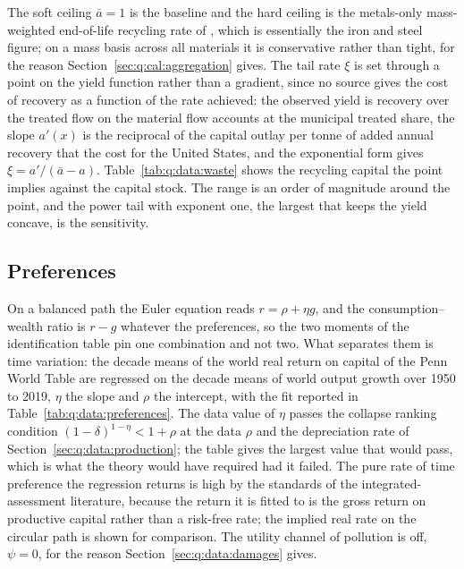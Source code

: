  The soft ceiling $\bar a=1$ is the baseline and the hard ceiling is the metals-only mass-weighted end-of-life recycling rate of \textcite{unepirp2011}, which is essentially the iron and steel figure; on a mass basis across all materials it is conservative rather than tight, for the reason Section~\ref{sec:q:cal:aggregation} gives. The tail rate $\xi$ is set through a point on the yield function rather than a gradient, since no source gives the cost of recovery as a function of the rate achieved: the observed yield is recovery over the treated flow on the material flow accounts at the municipal treated share, the slope $a'\left(x\right)$ is the reciprocal of the capital outlay per tonne of added annual recovery that the \textcite{epa2024} cost for the United States, and the exponential form gives $\xi=a'/\left(\bar a-a\right)$. Table~\ref{tab:q:data:waste} shows the recycling capital the point implies against the capital stock. The range is an order of magnitude around the point, and the power tail with exponent one, the largest that keeps the yield concave, is the sensitivity.



\subsection{Preferences}\label{sec:q:data:preferences}

On a balanced path the Euler equation reads $r=\rho+\eta g$, and the consumption--wealth ratio is $r-g$ whatever the preferences, so the two moments of the identification table pin one combination and not two. What separates them is time variation: the decade means of the world real return on capital of the Penn World Table are regressed on the decade means of world output growth over 1950 to 2019, $\eta$ the slope and $\rho$ the intercept, with the fit reported in Table~\ref{tab:q:data:preferences}. The data value of $\eta$ passes the collapse ranking condition $\left(1-\delta\right)^{1-\eta}<1+\rho$ at the data $\rho$ and the depreciation rate of Section~\ref{sec:q:data:production}; the table gives the largest value that would pass, which is what the theory would have required had it failed. The pure rate of time preference the regression returns is high by the standards of the integrated-assessment literature, because the return it is fitted to is the gross return on productive capital rather than a risk-free rate; the implied real rate on the circular path is shown for comparison. The utility channel of pollution is off, $\psi=0$, for the reason Section~\ref{sec:q:data:damages} gives.

